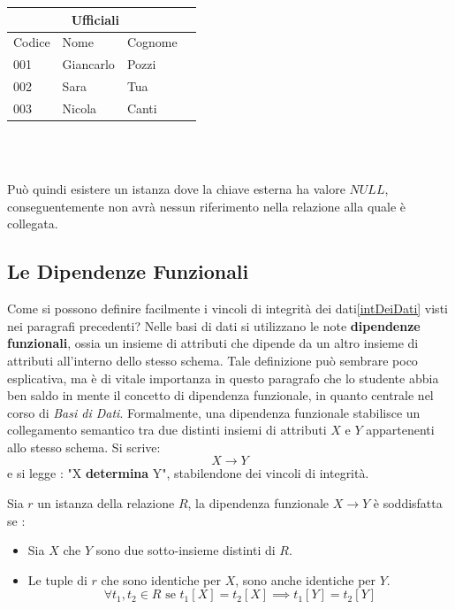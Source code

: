 \documentclass[12pt, letterpaper]{article}
\begin{document}
\begin{tabular}{|l|l|l|r|}
    \hline
\multicolumn{3}{|c|}{\textbf{Ufficiali}}\\
    \hline
    Codice & Nome & Cognome \\
    \hline
    001 & Giancarlo & Pozzi \\
    \hline
    002 & Sara & Tua \\
    \hline
    003 & Nicola & Canti \\
    \hline
    \end{tabular}
\\ 
 \hphantom{.}\\
 \raggedright
Può quindi esistere un istanza dove la chiave esterna ha valore \(NULL\),
conseguentemente non avrà nessun riferimento nella relazione alla quale è collegata. 
\subsection{Le Dipendenze Funzionali}
Come si possono definire facilmente i vincoli di integrità dei dati\ref{intDeiDati} visti nei paragrafi 
precedenti? Nelle basi di dati si utilizzano le note \textbf{dipendenze funzionali}, ossia un insieme
di attributi che dipende da un altro insieme di attributi all'interno dello stesso schema. Tale definizione
può sembrare poco esplicativa, ma è di vitale importanza in questo paragrafo che lo studente abbia
ben saldo in mente il concetto di dipendenza funzionale, in quanto centrale nel corso di \textit{Basi di Dati}.
Formalmente, una dipendenza funzionale stabilisce un collegamento semantico tra due distinti insiemi 
di attributi \(X\) e \(Y\) appartenenti allo stesso schema. Si scrive:
\begin{equation}
    X\rightarrow Y
\end{equation}
e si legge : "X \textbf{determina} Y", stabilendone dei vincoli di integrità.
\begin{theorem}
    Sia \(r\) un istanza della relazione \(R\), la dipendenza funzionale \(X\rightarrow Y\) è soddisfatta se :
    \begin{itemize}
        \item Sia \(X\) che \(Y\) sono due sotto-insieme distinti di \(R\).
        \item Le tuple di \(r\) che sono identiche per \(X\), sono anche identiche per \(Y\). \begin{equation}
            \forall t_1,t_2 \in R \text{ se } t_1[X]=t_2[X] \implies t_1[Y]=t_2[Y]
        \end{equation}
    \end{itemize}
\end{theorem}
\end{document}
